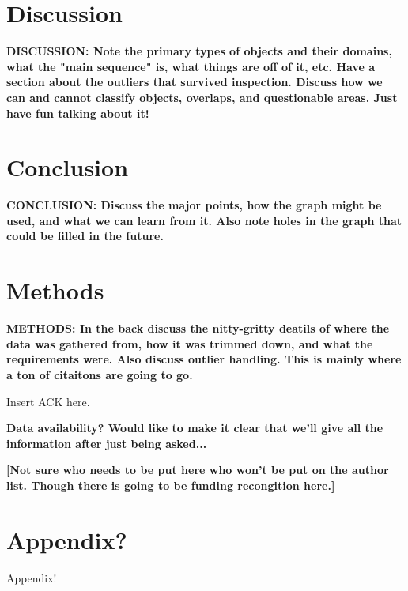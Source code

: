 \documentclass[twocolumn,linenumbers]{aastex631}
\begin{document}
\section{Discussion} \label{sec:intro}

\textbf{\color{blue}DISCUSSION: Note the primary types of objects and their domains, what the "main sequence" is, what things are off of it, etc. Have a section about the outliers that survived inspection. Discuss how we can and cannot classify objects, overlaps, and questionable areas. Just have fun talking about it!\color{black}}

\section{Conclusion} \label{sec:intro}

\textbf{\color{blue}CONCLUSION: Discuss the major points, how the graph might be used, and what we can learn from it. Also note holes in the graph that could be filled in the future. \color{black}}

\section{Methods} \label{sec:methods}

\textbf{\color{blue}METHODS: In the back discuss the nitty-gritty deatils of where the data was gathered from, how it was trimmed down, and what the requirements were. Also discuss outlier handling. This is mainly where a ton of citaitons are going to go. \color{black}}

\begin{acknowledgments}
Insert ACK here. 

\textbf{\color{blue}Data availability? Would like to make it clear that we'll give all the information after just being asked...\color{black}}

\textbf{\color{red}[Not sure who needs to be put here who won't be put on the author list. Though there is going to be funding recongition here.]\color{black}}
\end{acknowledgments}

\appendix

\section{Appendix?}

Appendix!

{}

\end{document}
